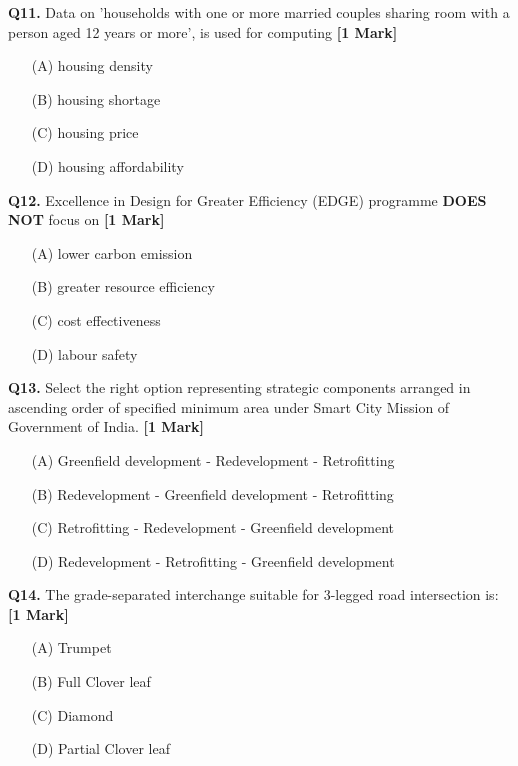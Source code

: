 \documentclass[11pt]{article}
\newcommand{\questiona}[2]{
    \noindent\textbf{Q#2.} #1 \hfill \textbf{[1 Mark]}
}
\begin{document}
\vspace{0.5cm}

\questiona{Data on 'households with one or more married couples sharing room with a person aged 12 years or more', is used for computing}{11}
\begin{enumerate}
    \item[(A)] housing density
    \item[(B)] housing shortage  
    \item[(C)] housing price
    \item[(D)] housing affordability
\end{enumerate}

\vspace{0.5cm}

\questiona{Excellence in Design for Greater Efficiency (EDGE) programme \textbf{DOES NOT} focus on}{12}
\begin{enumerate}
    \item[(A)] lower carbon emission  
    \item[(B)] greater resource efficiency  
    \item[(C)] cost effectiveness
    \item[(D)] labour safety
\end{enumerate}

\vspace{0.5cm}

\questiona{Select the right option representing strategic components arranged in ascending order of specified minimum area under Smart City Mission of Government of India.}{13}
\begin{enumerate}
    \item[(A)] Greenfield development - Redevelopment - Retrofitting
    \item[(B)] Redevelopment - Greenfield development - Retrofitting  
    \item[(C)] Retrofitting - Redevelopment - Greenfield development
    \item[(D)] Redevelopment - Retrofitting - Greenfield development
\end{enumerate}

\vspace{0.5cm}

\questiona{The grade-separated interchange suitable for 3-legged road intersection is:}{14}
\begin{enumerate}
    \item[(A)] Trumpet
    \item[(B)] Full Clover leaf  
    \item[(C)] Diamond
    \item[(D)] Partial Clover leaf
\end{enumerate}
\end{document}
